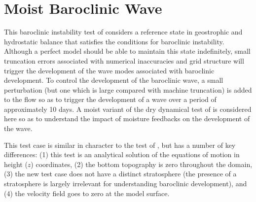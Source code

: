 \documentclass[times,doublespace]{fldauth}
\begin{document}

\clearpage
\section{Moist Baroclinic Wave}   
 
This baroclinic instability test of \cite{ullrich2014proposed} considers a reference state in geostrophic and hydrostatic balance that satisfies the conditions for baroclinic instability.  Although a perfect model should be able to maintain this state indefinitely, small truncation errors associated with numerical inaccuracies and grid structure will trigger the development of the wave modes associated with baroclinic development.  To control the development of the baroclinic wave, a small perturbation (but one which is large compared with machine truncation) is added to the flow so as to trigger the development of a wave over a period of approximately 10 days.  A moist variant of the dry dynamical test of \cite{ullrich2014proposed} is considered here so as to understand the impact of moisture feedbacks on the development of the wave.

This test case is similar in character to the test of \cite{jablonowski2006baroclinic}, but has a number of key differences:  (1) this test is an analytical solution of the equations of motion in height ($z$) coordinates, (2) the bottom topography is zero throughout the domain, (3) the new test case does not have a distinct stratosphere (the presence of a stratosphere is largely irrelevant for understanding baroclinic development), and (4) the velocity field goes to zero at the model surface.
 
\end{document}
